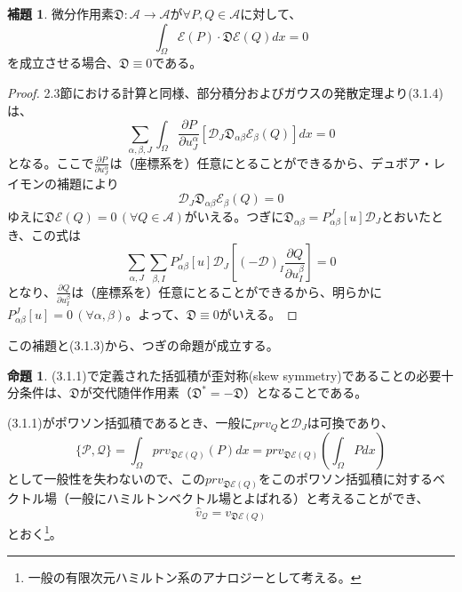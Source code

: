 \documentclass[a4paper, 11pt]{report}
\theoremstyle{definition}
\newtheorem{proposition}{命題}[section]
\newtheorem{lemma}{補題}[section]
\begin{document}
\begin{lemma}
 微分作用素$\mathfrak{D}:\mathcal{A}\longrightarrow\mathcal{A}$が$\forall P, Q \in \mathcal{A}$に対して、
\begin{equation}
\int_\Omega \mathcal{E}(P)\cdot\mathfrak{D} \mathcal{E}(Q)dx = 0  %
\end{equation}
を成立させる場合、$\mathfrak{D} \equiv 0$である。
\end{lemma}

\begin{proof}
 2.3節における計算と同様、部分積分およびガウスの発散定理より(3.1.4)は、
\begin{equation*}
\sum_{\alpha ,\beta ,J}\int_\Omega \frac{\partial P}{\partial u_J^\alpha} [\mathcal{D}_J\mathfrak{D}_{\alpha\beta}\mathcal{E}_\beta (Q)]dx = 0
\end{equation*}
となる。ここで$\frac{\partial P}{\partial u_J^\alpha}$は（座標系を）任意にとることができるから、デュボア・レイモンの補題により
\begin{equation*}
\mathcal{D}_J\mathfrak{D}_{\alpha\beta}\mathcal{E}_\beta (Q) = 0
\end{equation*}
ゆえに$\mathfrak{D}\mathcal{E}(Q)=0\, (\forall Q\in\mathcal{A})$がいえる。つぎに$\mathfrak{D}_{\alpha\beta}=P_{\alpha\beta}^J[u]\mathcal{D}_J$とおいたとき、この式は
\begin{equation*}
\sum_{\alpha, J}\sum_{\beta, I}P_{\alpha\beta}^J[u]\mathcal{D}_J[(-\mathcal{D})_I\frac{\partial Q}{\partial u_I^\beta} ] = 0
\end{equation*}
となり、$\frac{\partial Q}{\partial u_I^\beta}$は（座標系を）任意にとることができるから、明らかに$P_{\alpha\beta}^J[u]=0\, (\forall \alpha ,\beta )$。よって、$\mathfrak{D} \equiv 0$がいえる。
\end{proof}

 この補題と(3.1.3)から、つぎの命題が成立する。

\begin{proposition}
 (3.1.1)で定義された括弧積が歪対称(skew symmetry)であることの必要十分条件は、$\mathfrak{D}$が交代随伴作用素（$\mathfrak{D}^*=-\mathfrak{D}$）となることである。
\end{proposition}

 (3.1.1)がポワソン括弧積であるとき、一般に$prv_Q$と$\mathcal{D}_J$は可換であり、
\begin{equation*}
\{ \mathcal{P}, \mathcal{Q} \} = \int_\Omega prv_{\mathfrak{D}\mathcal{E}(Q)}(P)dx = prv_{\mathfrak{D}\mathcal{E}(Q)}(\int_\Omega Pdx)
\end{equation*}
として一般性を失わないので、この$prv_{\mathfrak{D}\mathcal{E}(Q)}$をこのポワソン括弧積に対するベクトル場（一般にハミルトンベクトル場とよばれる）と考えることができ、
\begin{equation*}
\hat{v}_\mathcal{Q} = v_{\mathfrak{D}\mathcal{E}(Q)}
\end{equation*}
とおく\footnote{一般の有限次元ハミルトン系のアナロジーとして考える。}。
\end{document}
